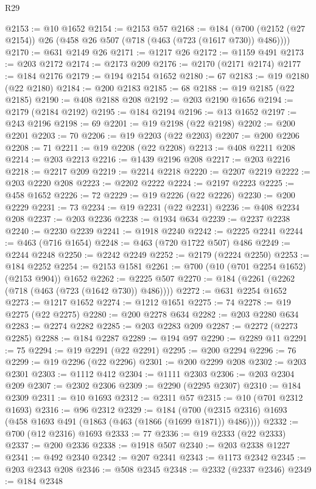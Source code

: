 \begin{lexlean}{R29}
\begin{coremodule}
@2153 := @10 @1652
@2154 := @2153 @57
@2168 := @184 (@700 (@2152 (@27 @2154)) @26 (@458 @26 @507 (@718 (@463 (@723 (@1617 @730)) @486))))
@2170 := @631 @2149 @26
@2171 := @1217 @26
@2172 := @1159 @491
@2173 := @203 @2172
@2174 := @2173 @209
@2176 := @2170 (@2171 @2174)
@2177 := @184 @2176
@2179 := @194 @2154 @1652
@2180 := 67
@2183 := @19 @2180 (@22 @2180)
@2184 := @200 @2183
@2185 := 68
@2188 := @19 @2185 (@22 @2185)
@2190 := @408 @2188 @208
@2192 := @203 @2190 @1656
@2194 := @2179 (@2184 @2192)
@2195 := @184 @2194
@2196 := @13 @1652
@2197 := @243 @2196
@2198 := 69
@2201 := @19 @2198 (@22 @2198)
@2202 := @200 @2201
@2203 := 70
@2206 := @19 @2203 (@22 @2203)
@2207 := @200 @2206
@2208 := 71
@2211 := @19 @2208 (@22 @2208)
@2213 := @408 @2211 @208
@2214 := @203 @2213
@2216 := @1439 @2196 @208
@2217 := @203 @2216
@2218 := @2217 @209
@2219 := @2214 @2218
@2220 := @2207 @2219
@2222 := @203 @2220 @208
@2223 := @2202 @2222
@2224 := @2197 @2223
@2225 := @458 @1652
@2226 := 72
@2229 := @19 @2226 (@22 @2226)
@2230 := @200 @2229
@2231 := 73
@2234 := @19 @2231 (@22 @2231)
@2236 := @408 @2234 @208
@2237 := @203 @2236
@2238 := @1934 @634
@2239 := @2237 @2238
@2240 := @2230 @2239
@2241 := @1918 @2240
@2242 := @2225 @2241
@2244 := @463 (@716 @1654)
@2248 := @463 (@720 @1722 @507) @486
@2249 := @2244 @2248
@2250 := @2242 @2249
@2252 := @2179 (@2224 @2250)
@2253 := @184 @2252
@2254 := @2153 @1581
@2261 := @700 (@10 (@701 @2254 @1652) (@2153 @904)) @1652
@2262 := @2225 @507
@2270 := @184 (@2261 (@2262 (@718 (@463 (@723 (@1642 @730)) @486))))
@2272 := @631 @2254 @1652
@2273 := @1217 @1652
@2274 := @1212 @1651
@2275 := 74
@2278 := @19 @2275 (@22 @2275)
@2280 := @200 @2278 @634
@2282 := @203 @2280 @634
@2283 := @2274 @2282
@2285 := @203 @2283 @209
@2287 := @2272 (@2273 @2285)
@2288 := @184 @2287
@2289 := @194 @97
@2290 := @2289 @11
@2291 := 75
@2294 := @19 @2291 (@22 @2291)
@2295 := @200 @2294
@2296 := 76
@2299 := @19 @2296 (@22 @2296)
@2301 := @200 @2299 @208
@2302 := @203 @2301
@2303 := @1112 @412
@2304 := @1111 @2303
@2306 := @203 @2304 @209
@2307 := @2302 @2306
@2309 := @2290 (@2295 @2307)
@2310 := @184 @2309
@2311 := @10 @1693
@2312 := @2311 @57
@2315 := @10 (@701 @2312 @1693)
@2316 := @96 @2312
@2329 := @184 (@700 (@2315 @2316) @1693 (@458 @1693 @491 (@1863 (@463 (@1866 (@1699 @1871)) @486))))
@2332 := @700 (@12 @2316) @1693
@2333 := 77
@2336 := @19 @2333 (@22 @2333)
@2337 := @200 @2336
@2338 := @1918 @507
@2340 := @203 @2338 @1227
@2341 := @492 @2340
@2342 := @207 @2341
@2343 := @1173 @2342
@2345 := @203 @2343 @208
@2346 := @508 @2345
@2348 := @2332 (@2337 @2346)
@2349 := @184 @2348

\end{coremodule}
\end{lexlean}
